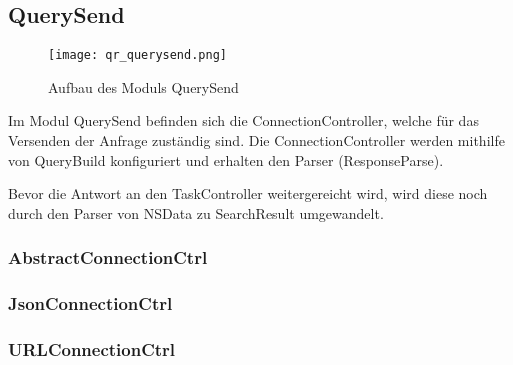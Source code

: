 
\subsection{QuerySend}

\begin{figure}[htb]
  \texttt{[image: qr\_querysend.png]}
  \caption{Aufbau des Moduls QuerySend}
	\label{fig:Aufbau des Moduls QuerySend}
\end{figure}

Im Modul QuerySend befinden sich die ConnectionController, welche für das Versenden der Anfrage zuständig sind. Die ConnectionController werden mithilfe von QueryBuild konfiguriert und erhalten den Parser (ResponseParse).

Bevor die Antwort an den TaskController weitergereicht wird, wird diese noch durch den Parser von NSData zu SearchResult umgewandelt.

\subsubsection{AbstractConnectionCtrl}
\subsubsection{JsonConnectionCtrl}
\subsubsection{URLConnectionCtrl}

